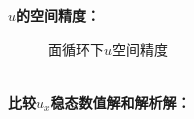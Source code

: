\documentclass[a4paper,11pt,UTF8]{article}%
\theoremstyle{plain}
\begin{document}
	\indent \textbf{$u$的空间精度：}
\begin{figure}[!h]
	\centering
	\caption{面循环下$u$空间精度}
\end{figure}\\
\newpage
	\textbf{比较$u_x$稳态数值解和解析解：}
\end{document}
